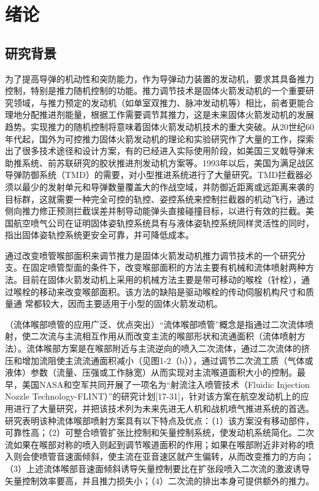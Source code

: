 \chapter{绪论}
\section{研究背景}

为了提高导弹的机动性和突防能力，作为导弹动力装置的发动机，要求其具备推力控制，特别是推力随机控制的功能。推力调节技术是固体火箭发动机的一个重要研究领域，与推力预定的发动机（如单室双推力、脉冲发动机等）相比，前者更能合理地分配推进剂能量，根据工作需要调节其推力，这是未来固体火箭发动机的发展趋势。实现推力的随机控制将意味着固体火箭发动机技术的重大突破。从20世纪60年代起，国外为可控推力固体火箭发动机的理论和实验研究作了大量的工作\cite{anon:53}，探索出了很多技术途径和设计方案，有的已经进入实际使用阶段，如美国三叉戟导弹末助推系统、前苏联研究的胶状推进剂发动机方案等。1993年以后，美国为满足战区导弹防御系统（TMD）的需要，对小型推进系统进行了大量研究。\cite{bhutta:90jsr}TMD拦截器必须以最少的发射单元和导弹数量覆盖大的作战空域，并防御近距离或远距离来袭的目标群，这就需要一种完全可控的轨控、姿控系统来控制拦截器的机动飞行，通过侧向推力修正预测拦截误差并制导动能弹头直接碰撞目标，以进行有效的拦截。美国航空喷气公司在证明固体姿轨控系统具有与液体姿轨控系统同样灵活性的同时，指出固体姿轨控系统更安全可靠，并可降低成本。

通过改变喷管喉部面积来调节推力是固体火箭发动机推力调节技术的一个研究分支。\cite{bhutta:90vra,bhutta:90cp}在固定喷管型面的条件下，改变喉部面积的方法主要有机械和流体喷射两种方法。目前在固体火箭发动机上采用的机械方法主要是带可移动的喉栓（针栓），通过喉栓的移动来改变喉部面积。该方法的缺陷是驱动喉栓的传动伺服机构尺寸和质量通 常都较大，因而主要适用于小型的固体火箭发动机。

（流体喉部喷管的应用广泛、优点突出）“流体喉部喷管”概念是指通过二次流体喷射，使二次流与主流相互作用从而改变主流的喉部形状和流通面积（流体喷射方法）。流体喉部方案是在喉部附近与主流逆向的喷入二次流体，通过二次流体的挤压和增加流阻使主流流通面积减小（见图1-2（b）），通过调节二次流工质（气体或液体）参数（流量、压强或工作脉宽）从而实现对主流喉道面积大小的控制。最早，美国NASA和空军共同开展了一项名为“射流注入喷管技术（Fluidic Injection Nozzle Technology-FLINT）”的研究计划[17-31]，针对该方案在航空发动机上的应用进行了大量研究，并把该技术列为未来先进无人机和战机喷气推进系统的首选。研究表明该种流体喉部喷射方案具有以下特点及优点：（1）该方案没有移动部件，可靠性高；（2）可整合喷管扩张比控制和矢量控制系统，使发动机系统简化。二次流如果在喉部对称的喷入则起到调节喉道面积的作用；如果在喉部附近非对称的喷入则会使喷管音速面倾斜，使主流在亚音速区就产生偏转，从而改变推力的方向；（3）上述流体喉部音速面倾斜诱导矢量控制要比在扩张段喷入二次流的激波诱导矢量控制效率要高，并且推力损失小；（4）二次流的排出本身可提供额外的推力。\cite{blottner:70cp,miner:75ncr,moss:90pc,sutton:85ar,thoman:66phd}

